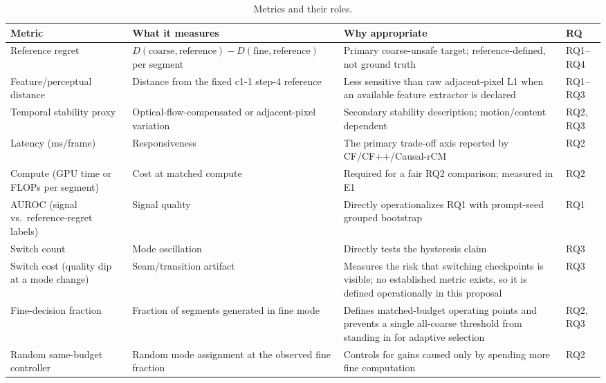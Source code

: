 \documentclass[11pt,a4paper]{article}
\begin{document}
\begin{table}[ht]
\centering
\small
\renewcommand{\arraystretch}{1.35}
\begin{tabularx}{\textwidth}{>{\raggedright\arraybackslash}p{3.1cm} >{\raggedright\arraybackslash}X >{\raggedright\arraybackslash}X >{\raggedright\arraybackslash}p{1.8cm}}
\toprule
\textbf{Metric} & \textbf{What it measures} & \textbf{Why appropriate} & \textbf{RQ} \\
\midrule
Reference regret & $D(\text{coarse},\text{reference})-D(\text{fine},\text{reference})$ per segment & Primary coarse-unsafe target; reference-defined, not ground truth & RQ1--RQ4 \\
Feature/perceptual distance & Distance from the fixed c1-1 step-4 reference & Less sensitive than raw adjacent-pixel L1 when an available feature extractor is declared & RQ1--RQ3 \\
Temporal stability proxy & Optical-flow-compensated or adjacent-pixel variation & Secondary stability description; motion/content dependent & RQ2, RQ3 \\
Latency (ms/frame) & Responsiveness & The primary trade-off axis reported by CF/CF++/Causal-rCM & RQ2 \\
Compute (GPU time or FLOPs per segment) & Cost at matched compute & Required for a fair RQ2 comparison; measured in E1 & RQ2 \\
AUROC (signal vs.\ reference-regret labels) & Signal quality & Directly operationalizes RQ1 with prompt-seed grouped bootstrap & RQ1 \\
Switch count & Mode oscillation & Directly tests the hysteresis claim & RQ3 \\
Switch cost (quality dip at a mode change) & Seam/transition artifact & Measures the risk that switching checkpoints is visible; no established metric exists, so it is defined operationally in this proposal & RQ3 \\
Fine-decision fraction & Fraction of segments generated in fine mode & Defines matched-budget operating points and prevents a single all-coarse threshold from standing in for adaptive selection & RQ2, RQ3 \\
Random same-budget controller & Random mode assignment at the observed fine fraction & Controls for gains caused only by spending more fine computation & RQ2 \\
\bottomrule
\end{tabularx}
\caption{Metrics and their roles.}
\label{tab:metrics}
\end{table}
\FloatBarrier
\end{document}
